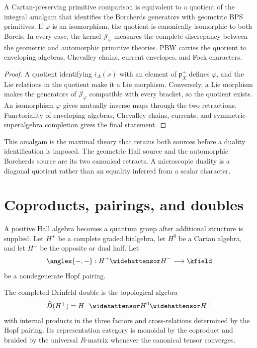 \begin{theorem}
A Cartan-preserving primitive comparison is equivalent to a quotient of the integral amalgam that identifies the Borcherds generators with geometric BPS primitives.  If $\varphi$ is an isomorphism, the quotient is canonically isomorphic to both Borels.  In every case, the kernel $\mathcal J_\varphi$ measures the complete discrepancy between the geometric and automorphic primitive theories.  PBW carries the quotient to enveloping algebras, Chevalley chains, current envelopes, and Fock characters.
\end{theorem}
\begin{proof}
A quotient identifying $i_\Delta(x)$ with an element of $\mathfrak p_X^+$ defines $\varphi$, and the Lie relations in the quotient make it a Lie morphism.  Conversely, a Lie morphism makes the generators of $\mathcal J_\varphi$ compatible with every bracket, so the quotient exists.  An isomorphism $\varphi$ gives mutually inverse maps through the two retractions.  Functoriality of enveloping algebras, Chevalley chains, currents, and symmetric-superalgebra completion gives the final statement.
\end{proof}

This amalgam is the maximal theory that retains both sources before a duality identification is imposed.  The geometric Hall source and the automorphic Borcherds source are its two canonical retracts.  A microscopic duality is a diagonal quotient rather than an equality inferred from a scalar character.

\chapter{Coproducts, pairings, and doubles}
A positive Hall algebra becomes a quantum group after additional structure is supplied. Let $H^+$ be a complete graded bialgebra, let $H^0$ be a Cartan algebra, and let $H^-$ be the opposite or dual half. Let
\[
 \angles{-,-}:H^+\widehattensor H^-\longrightarrow\kfield
\]
be a nondegenerate Hopf pairing.

\begin{definition}
The completed Drinfeld double is the topological algebra
\[
 \widehat D(H^+)=H^-\widehattensor H^0\widehattensor H^+
\]
with internal products in the three factors and cross-relations determined by the Hopf pairing. Its representation category is monoidal by the coproduct and braided by the universal $R$-matrix whenever the canonical tensor converges.
\end{definition}

